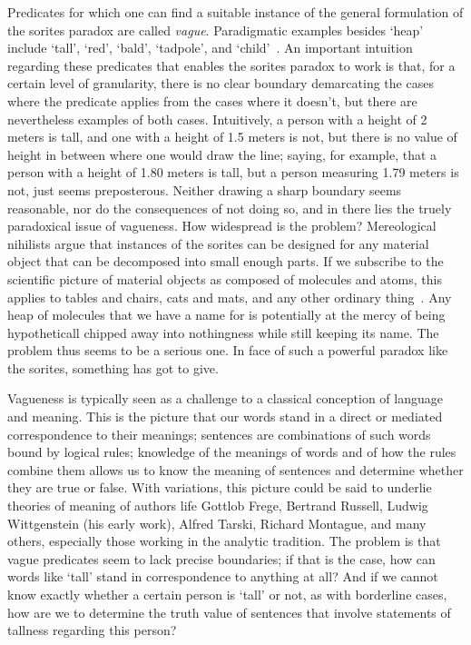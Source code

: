 \documentclass[a4paper]{article}
\begin{document}
Predicates for which one can find a suitable instance of the general formulation of the sorites paradox are called \emph{vague}.
Paradigmatic examples besides `heap' include `tall', `red', `bald', `tadpole', and `child'~\parencite{Keefe1997}.
An important intuition regarding these predicates that enables the sorites paradox to work is that, for a certain level of granularity, there is no clear boundary demarcating the cases where the predicate applies from the cases where it doesn't, but there are nevertheless examples of both cases.
Intuitively, a person with a height of 2 meters is tall, and one with a height of 1.5 meters is not, but there is no value of height in between where one would draw the line; saying, for example, that a person with a height of 1.80 meters is tall, but a person measuring 1.79 meters is not, just seems preposterous.
Neither drawing a sharp boundary seems reasonable, nor do the consequences of not doing so, and in there lies the truely paradoxical issue of vagueness.
How widespread is the problem?
Mereological nihilists argue that instances of the sorites can be designed for any material object that can be decomposed into small enough parts.
If we subscribe to the scientific picture of material objects as composed of molecules and atoms, this applies to tables and chairs, cats and mats, and any other ordinary thing~\parencite{Unger1979}.
Any heap of molecules that we have a name for is potentially at the mercy of being hypotheticall chipped away into nothingness while still keeping its name.
The problem thus seems to be a serious one.
In face of such a powerful paradox like the sorites, something has got to give.

Vagueness is typically seen as a challenge to a classical conception of language and meaning.
This is the picture that our words stand in a direct or mediated correspondence to their meanings; sentences are combinations of such words bound by logical rules; knowledge of the meanings of words and of how the rules combine them allows us to know the meaning of sentences and determine whether they are true or false.
With variations, this picture could be said to underlie theories of meaning of authors life Gottlob Frege, Bertrand Russell, Ludwig Wittgenstein (his early work), Alfred Tarski, Richard Montague, and many others, especially those working in the analytic tradition.
The problem is that vague predicates seem to lack precise boundaries; if that is the case, how can words like `tall' stand in correspondence to anything at all?
And if we cannot know exactly whether a certain person is `tall' or not, as with borderline cases, how are we to determine the truth value of sentences that involve statements of tallness regarding this person?
\end{document}
